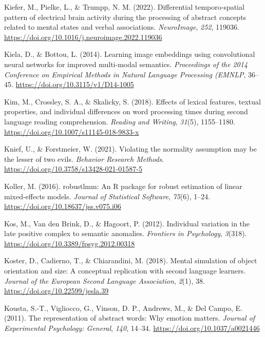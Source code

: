 \documentclass[
  12pt,
  man,floatsintext]{apa7}
\newlength{\cslhangindent}
\newlength{\cslentryspacingunit} %
\newenvironment{CSLReferences}[2] %
 {%
  \setlength{\parindent}{0pt}
  \ifodd #1
  \let\oldpar\par
  \def\par{\hangindent=\cslhangindent\oldpar}
  \fi
  \setlength{\parskip}{#2\cslentryspacingunit}
 }%
 {}
\begin{document}
\begin{CSLReferences}{1}{0}
\leavevmode{}%
Kiefer, M., Pielke, L., \& Trumpp, N. M. (2022). Differential temporo-spatial pattern of electrical brain activity during the processing of abstract concepts related to mental states and verbal associations. \emph{NeuroImage}, \emph{252}, 119036. \url{https://doi.org/10.1016/j.neuroimage.2022.119036}

\leavevmode{}%
Kiela, D., \& Bottou, L. (2014). Learning image embeddings using convolutional neural networks for improved multi-modal semantics. \emph{Proceedings of the 2014 Conference on Empirical Methods in Natural Language Processing ({EMNLP}}, 36--45. \url{https://doi.org/10.3115/v1/D14-1005}

\leavevmode{}%
Kim, M., Crossley, S. A., \& Skalicky, S. (2018). Effects of lexical features, textual properties, and individual differences on word processing times during second language reading comprehension. \emph{Reading and Writing}, \emph{31}(5), 1155--1180. \url{https://doi.org/10.1007/s11145-018-9833-x}

\leavevmode{}%
Knief, U., \& Forstmeier, W. (2021). Violating the normality assumption may be the lesser of two evils. \emph{Behavior Research Methods}. \url{https://doi.org/10.3758/s13428-021-01587-5}

\leavevmode{}%
Koller, M. (2016). {robustlmm}: An {R} package for robust estimation of linear mixed-effects models. \emph{Journal of Statistical Software}, \emph{75}(6), 1--24. \url{https://doi.org/10.18637/jss.v075.i06}

\leavevmode{}%
Kos, M., Van den Brink, D., \& Hagoort, P. (2012). Individual variation in the late positive complex to semantic anomalies. \emph{Frontiers in Psychology}, \emph{3}(318). \url{https://doi.org/10.3389/fpsyg.2012.00318}

\leavevmode{}%
Koster, D., Cadierno, T., \& Chiarandini, M. (2018). Mental simulation of object orientation and size: {A} conceptual replication with second language learners. \emph{Journal of the European Second Language Association}, \emph{2}(1), 38. \url{https://doi.org/10.22599/jesla.39}

\leavevmode{}%
Kousta, S.-T., Vigliocco, G., Vinson, D. P., Andrews, M., \& Del Campo, E. (2011). The representation of abstract words: {Why} emotion matters. \emph{Journal of Experimental Psychology: General}, \emph{140}, 14--34. \url{https://doi.org/10.1037/a0021446}


\end{CSLReferences}
\end{document}
